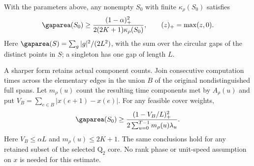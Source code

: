 \begin{lemma}\label{lem:fractional-gap}
With the parameters above, any nonempty $S_0$ with finite
$\kappa_\rho(S_0)$ satisfies
\begin{equation}\label{eq:fractional-gap}
 \gaparea(S_0)\ge
 \frac{(1-\alpha)_+^2}{2(2K+1)\kappa_\rho(S_0)},
 \qquad (z)_+=\max(z,0).
\end{equation}
Here $\gaparea(S)=\sum_g |g|^2/(2L^2)$, with the sum over the circular
gaps of the distinct points in $S$; a singleton has one gap of length $L$.

A sharper form retains actual component counts. Join consecutive
computation times across the elementary edges in the union $B$ of the
original nondistinguished full spans. Let $m_\rho(u)$ count the resulting
time components met by $A_\rho(u)$ and put
$V_B=\sum_{e\in B}|x(e+1)-x(e)|$. For any feasible cover weights,
\begin{equation}\label{eq:fractional-gap-incidence}
 \gaparea(S_0)\ge
 \frac{(1-V_B/L)_+^2}{2\sum_{u=0}^{T-1}m_\rho(u)\lambda_u}.
\end{equation}
Here $V_B\le\alpha L$ and $m_\rho(u)\le2K+1$.
The same conclusions hold for any retained subset of the selected
$\mathrm Q_2$ core. No rank phase or unit-speed assumption on $x$ is
needed for this estimate.
\end{lemma}
